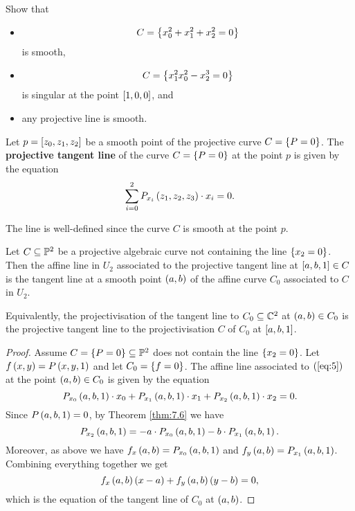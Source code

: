 \begin{exercise}
Show that
\begin{itemize}
\item
$$ C = \cb{x_0^2 + x_1^2 + x_2^2 = 0} $$
is smooth,
\item
$$ C = \cb{x_1^2x_0^2 - x_2^3 = 0} $$
is singular at the point $ \sb{1, 0, 0} $, and
\item any projective line is smooth.
\end{itemize}
\end{exercise}

\begin{definition}
Let $ p = \sb{z_0, z_1, z_2} $ be a smooth point of the projective curve $ C = \cb{P = 0} $. The \textbf{projective tangent line} of the curve $ C = \cb{P = 0} $ at the point $ p $ is given by the equation
\begin{equation}
\label{eq:5}
\sum_{i = 0}^2 P_{x_i}\rb{z_1, z_2, z_3} \cdot x_i = 0.
\end{equation}
\end{definition}

\begin{note*}
The line is well-defined since the curve $ C $ is smooth at the point $ p $.
\end{note*}

\begin{proposition}
Let $ C \subseteq \P^2 $ be a projective algebraic curve not containing the line $ \cb{x_2 = 0} $. Then the affine line in $ U_2 $ associated to the projective tangent line at $ \sb{a, b, 1} \in C $ is the tangent line at a smooth point $ \rb{a, b} $ of the affine curve $ C_0 $ associated to $ C $ in $ U_2 $.
\end{proposition}

Equivalently, the projectivisation of the tangent line to $ C_0 \subseteq \C^2 $ at $ \rb{a, b} \in C_0 $ is the projective tangent line to the projectivisation $ C $ of $ C_0 $ at $ \sb{a, b, 1} $.

\begin{proof}
Assume $ C = \cb{P = 0} \subseteq \P^2 $ does not contain the line $ \cb{x_2 = 0} $. Let $ f\rb{x, y} = P\rb{x, y, 1} $ and let $ C_0 = \cb{f = 0} $. The affine line associated to $ \rb{\ref{eq:5}} $ at the point $ \rb{a, b} \in C_0 $ is given by the equation
$$ P_{x_0}\rb{a, b, 1} \cdot x_0 + P_{x_1}\rb{a, b, 1} \cdot x_1 + P_{x_2}\rb{a, b, 1} \cdot x_2 = 0. $$
Since $ P\rb{a, b, 1} = 0 $, by Theorem \ref{thm:7.6} we have
$$ P_{x_2}\rb{a, b, 1} = -a \cdot P_{x_0}\rb{a, b, 1} - b \cdot P_{x_1}\rb{a, b, 1}. $$
Moreover, as above we have $ f_x\rb{a, b} = P_{x_0}\rb{a, b, 1} $ and $ f_y\rb{a, b} = P_{x_1}\rb{a, b, 1} $. Combining everything together we get
$$ f_x\rb{a, b}\rb{x - a} + f_y\rb{a, b}\rb{y - b} = 0, $$
which is the equation of the tangent line of $ C_0 $ at $ \rb{a, b} $.
\end{proof}

